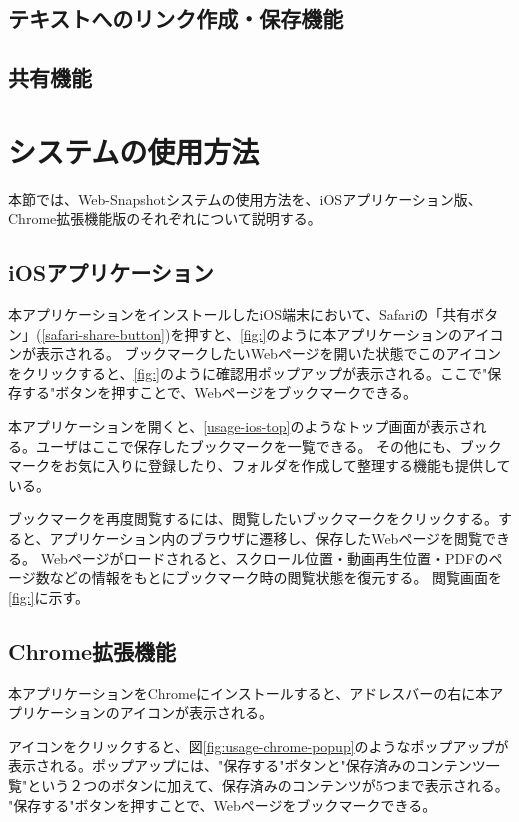 \subsection{テキストへのリンク作成・保存機能}
\subsection{共有機能}

\section{システムの使用方法}
本節では、Web-Snapshotシステムの使用方法を、iOSアプリケーション版、Chrome拡張機能版のそれぞれについて説明する。

\subsection{iOSアプリケーション}
本アプリケーションをインストールしたiOS端末において、Safariの「共有ボタン」(\ref{safari-share-button})を押すと、\ref{fig:}のように本アプリケーションのアイコンが表示される。
ブックマークしたいWebページを開いた状態でこのアイコンをクリックすると、\ref{fig:}のように確認用ポップアップが表示される。ここで"保存する"ボタンを押すことで、Webページをブックマークできる。

本アプリケーションを開くと、\ref{usage-ios-top}のようなトップ画面が表示される。ユーザはここで保存したブックマークを一覧できる。
その他にも、ブックマークをお気に入りに登録したり、フォルダを作成して整理する機能も提供している。

ブックマークを再度閲覧するには、閲覧したいブックマークをクリックする。すると、アプリケーション内のブラウザに遷移し、保存したWebページを閲覧できる。
Webページがロードされると、スクロール位置・動画再生位置・PDFのページ数などの情報をもとにブックマーク時の閲覧状態を復元する。
閲覧画面を\ref{fig:}に示す。

\subsection{Chrome拡張機能}
本アプリケーションをChromeにインストールすると、アドレスバーの右に本アプリケーションのアイコンが表示される。

アイコンをクリックすると、図\ref{fig:usage-chrome-popup}のようなポップアップが表示される。ポップアップには、"保存する"ボタンと"保存済みのコンテンツ一覧"という２つのボタンに加えて、保存済みのコンテンツが5つまで表示される。
"保存する"ボタンを押すことで、Webページをブックマークできる。

